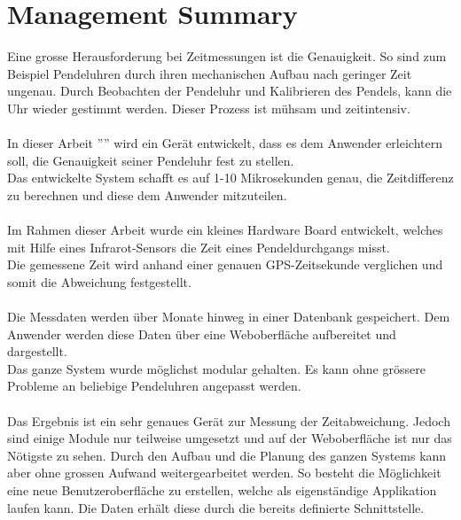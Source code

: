 \section{Management Summary}
Eine grosse Herausforderung bei Zeitmessungen ist die Genauigkeit. So sind zum Beispiel Pendeluhren durch ihren mechanischen Aufbau nach geringer Zeit ungenau. Durch Beobachten der Pendeluhr und Kalibrieren des Pendels, kann die Uhr wieder gestimmt werden. Dieser Prozess ist mühsam und zeitintensiv.\\
\\
In dieser Arbeit ''\documenttitle'' wird ein Gerät entwickelt, dass es dem Anwender erleichtern soll, die Genauigkeit seiner Pendeluhr fest zu stellen.\\
Das entwickelte System schafft es auf 1-10 Mikrosekunden genau, die Zeitdifferenz zu berechnen und diese dem Anwender mitzuteilen.\\
\\
Im Rahmen dieser Arbeit wurde ein kleines Hardware Board entwickelt, welches mit Hilfe eines Infrarot-Sensors die Zeit eines Pendeldurchgangs misst.\\
Die gemessene Zeit wird anhand einer genauen GPS-Zeitsekunde verglichen und somit die Abweichung festgestellt.\\
\\
Die Messdaten werden über Monate hinweg in einer Datenbank gespeichert.
Dem Anwender werden diese Daten über eine Weboberfläche aufbereitet und dargestellt.\\
Das ganze System wurde möglichst modular gehalten. Es kann ohne grössere Probleme an beliebige Pendeluhren angepasst werden.\\
\\
Das Ergebnis ist ein sehr genaues Gerät zur Messung der Zeitabweichung. 
Jedoch sind einige Module nur teilweise umgesetzt und auf der Weboberfläche ist nur das Nötigste zu sehen. 
Durch den Aufbau und die Planung des ganzen Systems kann aber ohne grossen Aufwand weitergearbeitet werden. 
So besteht die Möglichkeit eine neue Benutzeroberfläche zu erstellen, welche als eigenständige Applikation laufen kann. Die Daten erhält diese durch die bereits definierte Schnittstelle.

